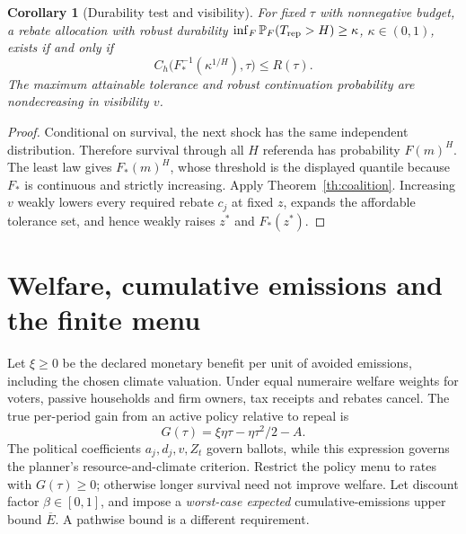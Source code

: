 \documentclass[11pt,a4paper]{article}
\newtheorem{corollary}[theorem]{Corollary}
\theoremstyle{definition}
\theoremstyle{remark}
\newcommand{\Prb}{\mathbb P}
\begin{document}
\begin{corollary}[Durability test and visibility]
For fixed $\tau$ with nonnegative budget, a rebate allocation with robust durability $\inf_F\Prb_F(T_{\rm rep}>H)\geq\kappa$, $\kappa\in(0,1)$, exists if and only if
\[
 C_h\bigl(F_*^{-1}(\kappa^{1/H}),\tau\bigr)\leq R(\tau).
\]
The maximum attainable tolerance and robust continuation probability are nondecreasing in visibility $v$.
\end{corollary}
\begin{proof}
Conditional on survival, the next shock has the same independent distribution. Therefore survival through all $H$ referenda has probability $F(m)^H$. The least law gives $F_*(m)^H$, whose threshold is the displayed quantile because $F_*$ is continuous and strictly increasing. Apply Theorem~\ref{th:coalition}. Increasing $v$ weakly lowers every required rebate $c_j$ at fixed $z$, expands the affordable tolerance set, and hence weakly raises $z^*$ and $F_*(z^*)$.
\end{proof}

\section{Welfare, cumulative emissions and the finite menu}
Let $\xi\geq0$ be the declared monetary benefit per unit of avoided emissions, including the chosen climate valuation. Under equal numeraire welfare weights for voters, passive households and firm owners, tax receipts and rebates cancel. The true per-period gain from an active policy relative to repeal is
\[
 G(\tau)=\xi\eta\tau-\eta\tau^2/2-A.
\]
The political coefficients $a_j,d_j,v,Z_t$ govern ballots, while this expression governs the planner's resource-and-climate criterion. Restrict the policy menu to rates with $G(\tau)\geq0$; otherwise longer survival need not improve welfare. Let discount factor $\beta\in[0,1]$, and impose a \emph{worst-case expected} cumulative-emissions upper bound $\overline E$. A pathwise bound is a different requirement.
\end{document}
